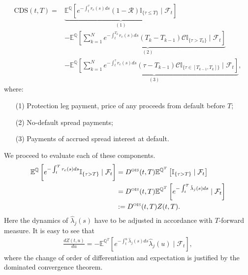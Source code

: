 \documentclass[12pt,a4paper]{article}
\theoremstyle{plain}
\numberwithin{equation}{section}
\begin{document}
{\normalsize
\begin{align}\label{Payoff}
\mbox{CDS}(t,T)=&\underbrace{\mathbb{E}^\mathbb{Q}\left[e^{-\int_t^\tau r_c(s)ds }(1-\mathcal{R})\mathbb{I}_{\{\tau\leq T\}}\mid \mathcal{F}_t\right]}_{(1)}\\
&-\underbrace{\mathbb{E}^\mathbb{Q}\left[\sum_{k=1}^N e^{-\int_t^{T_k} r_c(s)ds }(T_k-T_{k-1})\mathcal{C}\mathbb{I}_{\{\tau> T_k\}}\mid \mathcal{F}_t\right]}_{(2)}\\ \nonumber
&-\underbrace{\mathbb{E}^\mathbb{Q}\left[\sum_{k=1}^N e^{-\int_t^{\tau} r_c(s)ds }(\tau-T_{k-1})\mathcal{C}\mathbb{I}_{\{\tau\in [T_{k-1},T_k]\}}\mid \mathcal{F}_t\right]}_{(3)},
\end{align}}
where:
\begin{itemize}
\item[(1)] Protection leg payment,  price of any proceeds from default before $T$;
\item[(2)] No-default spread payments;
\item[(3)] Payments of accrued spread interest at default.
\end{itemize}
We proceed to evaluate each of these components.
\begin{align}\label{Premium}
\mathbb{E}^\mathbb{Q}\left[e^{-\int_t^{T} r_c(s)ds }\mathbb{I}_{\{\tau> T\}}\mid \mathcal{F}_t\right]&= D^{\tiny \mbox{OIS}}(t,T)\mathbb{E}^{\mathbb{Q}^{T}}\left[\mathbb{I}_{\{\tau> T\}}\mid \mathcal{F}_t\right]\\ \nonumber
&=D^{\tiny \mbox{OIS}}(t,T)\mathbb{E}^{\mathbb{Q}^{T}}\left[e^{-\int_t^T \hat{\lambda}_j(s)ds}\mid \mathcal{F}_t\right]\\ \nonumber
&:=D^{\tiny \mbox{OIS}}(t,T)Z(t,T).
\end{align}
Here the dynamics of $\hat{\lambda}_j(s)$ have to be adjusted in accordance with $T$-forward measure.
It is easy to see that
\begin{align}
\frac{dZ(t,u)}{du}=-\mathbb{E}^{\mathbb{Q}^{T}}\left[e^{-\int_t^u \hat{\lambda}_j(s)ds}\hat{\lambda}_j(u)\mid \mathcal{F}_t\right],
\end{align}
where the change of order of differentiation and expectation is justified by the dominated convergence theorem.
\end{document}

